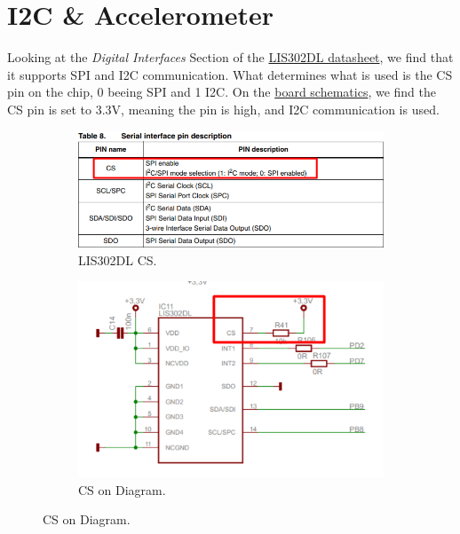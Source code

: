 \documentclass{article}
\begin{document}
\section{I2C \& Accelerometer}
Looking at the \textit{Digital Interfaces} Section of the \href{http://www.st.com/content/ccc/resource/technical/document/datasheet/63/67/d2/6d/88/e0/4e/39/CD00135460.pdf/files/CD00135460.pdf/jcr:content/translations/en.CD00135460.pdf}{LIS302DL datasheet},
we find that it supports SPI and I2C communication. What determines what is used
is the CS pin on the chip, 0 beeing SPI and 1 I2C. On the \href{http://www.keil.com/mcbstm32c/mcbstm32c-base-board-schematics.pdf}{board schematics},
we find the CS pin is set to 3.3V, meaning the pin is high, and I2C communication is used.\\
\begin{figure}[H]
    \centering
    \begin{subfigure}[b]{0.45\linewidth}
        \includegraphics[width=\linewidth]{pics/I2CChipSelect.png}
        \caption{LIS302DL CS.}
    \end{subfigure}
    \begin{subfigure}[b]{0.45\linewidth}
        \includegraphics[width=\linewidth]{pics/LISCSHigh.png}
        \caption{CS on Diagram.}
    \end{subfigure}
    \label{fig:CS}
\end{figure}
\end{document}

